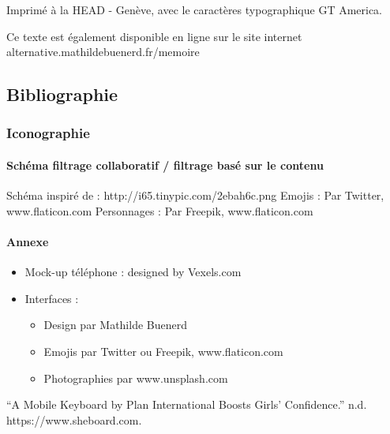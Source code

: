 \documentclass[]{article}
\providecommand{\tightlist}{%
  \setlength{\itemsep}{0pt}\setlength{\parskip}{0pt}}
\let\oldparagraph\paragraph
\renewcommand{\paragraph}[1]{\oldparagraph{#1}\mbox{}}
\begin{document}
\newpage

Imprimé à la HEAD - Genève, avec le caractères typographique GT America.

Ce texte est également disponible en ligne sur le site internet
alternative.mathildebuenerd.fr/memoire

\newpage

\hypertarget{bibliographie}{%
\subsection{Bibliographie}\label{bibliographie}}

\hypertarget{iconographie}{%
\subsubsection{Iconographie}\label{iconographie}}

\hypertarget{schuxe9ma-filtrage-collaboratif-filtrage-basuxe9-sur-le-contenu}{%
\paragraph{Schéma filtrage collaboratif / filtrage basé sur le
contenu}\label{schuxe9ma-filtrage-collaboratif-filtrage-basuxe9-sur-le-contenu}}

Schéma inspiré de : http://i65.tinypic.com/2ebah6c.png Emojis : Par
Twitter, www.flaticon.com Personnages : Par Freepik, www.flaticon.com

\hypertarget{annexe}{%
\paragraph{Annexe}\label{annexe}}

\begin{itemize}
\tightlist
\item
  Mock-up téléphone : designed by Vexels.com
\item
  Interfaces :

  \begin{itemize}
  \tightlist
  \item
    Design par Mathilde Buenerd
  \item
    Emojis par Twitter ou Freepik, www.flaticon.com
  \item
    Photographies par www.unsplash.com
  \end{itemize}
\end{itemize}

\hypertarget{refs}{}
\leavevmode\hypertarget{ref-zotero-89}{}%
``A Mobile Keyboard by Plan International Boosts Girls' Confidence.''
n.d. https://www.sheboard.com.
\end{document}
